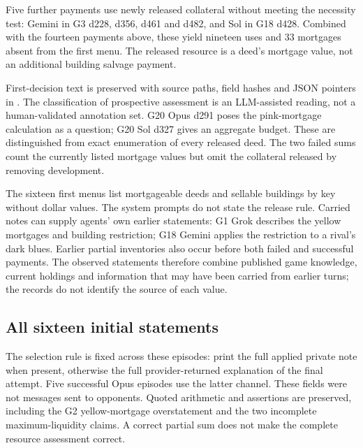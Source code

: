 Five further payments use newly released collateral without meeting the necessity test: Gemini in G3 d228, d356, d461 and d482, and Sol in G18 d428. Combined with the fourteen payments above, these yield nineteen uses and 33 mortgages absent from the first menu. The released resource is a deed's mortgage value, not an additional building salvage payment.

First-decision text is preserved with source paths, field hashes and JSON pointers in . The classification of prospective assessment is an LLM-assisted reading, not a human-validated annotation set. G20 Opus d291 poses the pink-mortgage calculation as a question; G20 Sol d327 gives an aggregate budget. These are distinguished from exact enumeration of every released deed. The two failed sums count the currently listed mortgage values but omit the collateral released by removing development.

The sixteen first menus list mortgageable deeds and sellable buildings by key without dollar values. The system prompts do not state the release rule. Carried notes can supply agents' own earlier statements: G1 Grok describes the yellow mortgages and building restriction; G18 Gemini applies the restriction to a rival's dark blues. Earlier partial inventories also occur before both failed and successful payments. The observed statements therefore combine published game knowledge, current holdings and information that may have been carried from earlier turns; the records do not identify the source of each value.

\subsection{All sixteen initial statements}
\label{app:initial-texts}
The selection rule is fixed across these episodes: print the full applied private note when present, otherwise the full provider-returned explanation of the final attempt. Five successful Opus episodes use the latter channel. These fields were not messages sent to opponents. Quoted arithmetic and assertions are preserved, including the G2 yellow-mortgage overstatement and the two incomplete maximum-liquidity claims. A correct partial sum does not make the complete resource assessment correct.



